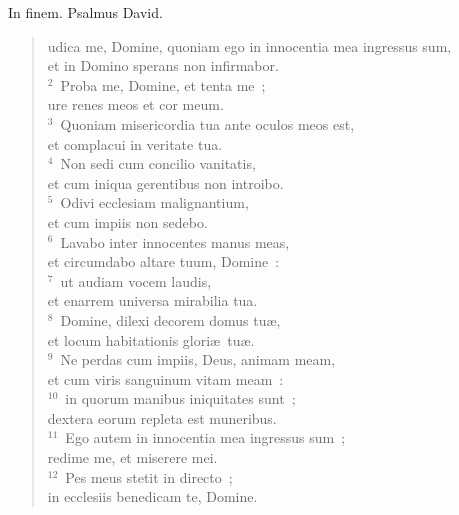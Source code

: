 \bchapter[Psalm]
In finem. Psalmus David. \begin{verse}udica me, Domine, quoniam ego in innocentia mea ingressus sum,\\ et in Domino sperans non infirmabor.\\
${}^{2}$~Proba me, Domine, et tenta me~;\\ ure renes meos et cor meum.\\
${}^{3}$~Quoniam misericordia tua ante oculos meos est,\\ et complacui in veritate tua.\\
${}^{4}$~Non sedi cum concilio vanitatis,\\ et cum iniqua gerentibus non introibo.\\
${}^{5}$~Odivi ecclesiam malignantium,\\ et cum impiis non sedebo.\\
${}^{6}$~Lavabo inter innocentes manus meas,\\ et circumdabo altare tuum, Domine~:\\
${}^{7}$~ut audiam vocem laudis,\\ et enarrem universa mirabilia tua.\\
${}^{8}$~Domine, dilexi decorem domus tu\ae ,\\ et locum habitationis glori\ae\ tu\ae .\\
${}^{9}$~Ne perdas cum impiis, Deus, animam meam,\\ et cum viris sanguinum vitam meam~:\\
${}^{10}$~in quorum manibus iniquitates sunt~;\\ dextera eorum repleta est muneribus.\\
${}^{11}$~Ego autem in innocentia mea ingressus sum~;\\ redime me, et miserere mei.\\
${}^{12}$~Pes meus stetit in directo~;\\ in ecclesiis benedicam te, Domine.\end{verse}



